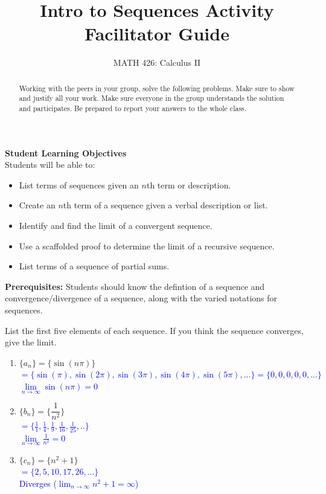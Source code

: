 \documentclass{ximera}
\title{Intro to Sequences Activity Facilitator Guide}
\author{MATH 426: Calculus II}
\begin{document}
\begin{abstract}
   Working with the peers in your group, solve the following problems. Make sure to show and justify all your work. Make sure everyone in the group understands the solution and participates. Be prepared to report your answers to the whole class. 
\end{abstract}
\maketitle

\textbf{Student Learning Objectives}\\
Students will be able to:
    \begin{itemize}
        \item List terms of sequences given an $n$th term or description.
        \item Create an $n$th term of a sequence given a verbal description or list.
        \item Identify and find the limit of a convergent sequence.
        \item Use a scaffolded proof to determine the limit of a recursive sequence.
        \item List terms of a sequence of partial sums.
    \end{itemize}

\textbf{Prerequisites:} Students should know the defintion of a sequence and convergence/divergence of a sequence, along with the varied notations for sequences. 

\begin{exercise}
 List the first five elements of each sequence.  If you think the sequence converges, give the limit.
\begin{enumerate}
    \item $\{a_n\}=\{\sin(n\pi)\}$\\
    \textcolor{blue}{ $=\{\sin(\pi), \sin(2\pi), \sin(3\pi),\sin(4\pi),\sin(5\pi),...\}=\{0,0,0,0,0,...\}$\\
    $\lim\limits_{n\rightarrow \infty}\sin(n\pi)=0$}
    \item $\{b_n\}=\bigg\{\dfrac{1}{n^2}\bigg\}$\\
    \textcolor{blue}{ $=\{\frac{1}{1}, \frac14, \frac19,\frac1{16}, \frac{1}{25},..\}$\\
    $\lim\limits_{n\rightarrow \infty} \frac{1}{n^2}=0$}
    \item $\{c_n\}=\{n^2+1\}$\\
    \textcolor{blue}{ $=\{2, 5, 10, 17, 26, ...\}$\\
    Diverges ($\lim_{n\rightarrow \infty}n^2+1=\infty$)}
\end{enumerate}

\end{exercise}
\end{document}
